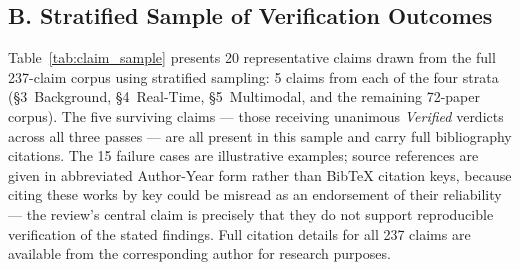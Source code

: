 \subsection*{B. Stratified Sample of Verification Outcomes}

Table~\ref{tab:claim_sample} presents 20 representative claims drawn from
the full 237-claim corpus using stratified sampling: 5 claims from each of
the four strata (§3~Background, §4~Real-Time, §5~Multimodal, and the
remaining 72-paper corpus).
The five surviving claims — those receiving unanimous \textit{Verified}
verdicts across all three passes — are all present in this sample
and carry full bibliography citations.
The 15 failure cases are illustrative examples; source references are
given in abbreviated Author-Year form rather than BibTeX citation keys,
because citing these works by key could be misread as an endorsement of
their reliability — the review's central claim is precisely that they do
not support reproducible verification of the stated findings.
Full citation details for all 237 claims are available from the
corresponding author for research purposes.

